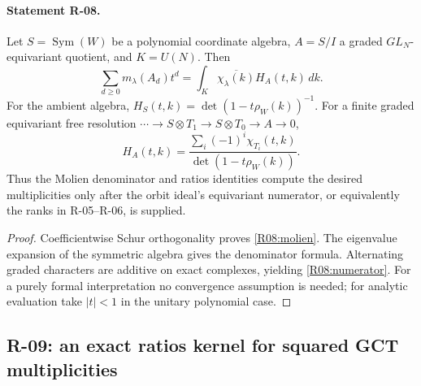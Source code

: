 \paragraph{Statement R-08.}
Let $S=\operatorname{Sym}(W)$ be a polynomial coordinate algebra,
$A=S/I$ a graded $GL_N$-equivariant quotient, and $K=U(N)$. Then
\begin{equation}\label{R08:molien}
 \sum_{d\geq0}m_\lambda(A_d)t^d
   =\int_K\overline{\chi_\lambda(k)}H_A(t,k)\,dk.
\end{equation}
For the ambient algebra,
$H_S(t,k)=\det(1-t\rho_W(k))^{-1}$.
For a finite graded equivariant free resolution
$\cdots\to S\otimes T_1\to S\otimes T_0\to A\to0$,
\begin{equation}\label{R08:numerator}
 H_A(t,k)=
 \frac{\sum_i(-1)^i\chi_{T_i}(t,k)}
      {\det(1-t\rho_W(k))}.
\end{equation}
Thus the Molien denominator and ratios identities compute the desired
multiplicities only after the orbit ideal's equivariant numerator,
or equivalently the ranks in R-05--R-06, is supplied.

\begin{proof}
Coefficientwise Schur orthogonality proves \eqref{R08:molien}.
The eigenvalue expansion of the symmetric algebra gives the
denominator formula. Alternating graded characters are additive
on exact complexes, yielding \eqref{R08:numerator}. For a purely
formal interpretation no convergence assumption is needed; for
analytic evaluation take $|t|<1$ in the unitary polynomial case.
\end{proof}

\subsection{R-09: an exact ratios kernel for squared GCT multiplicities}

